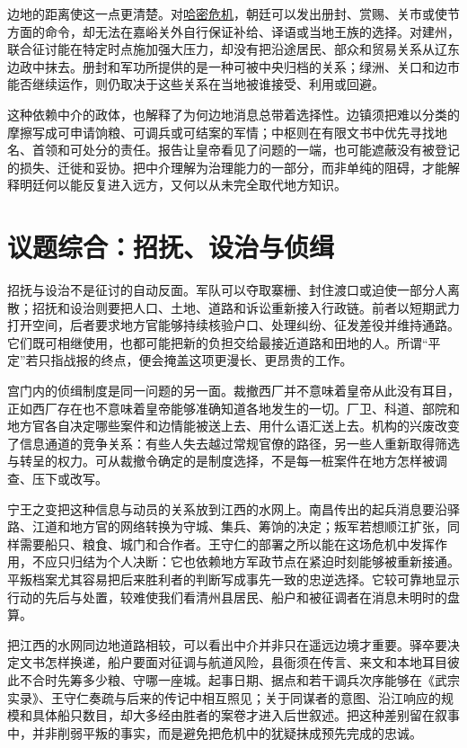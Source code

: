 边地的距离使这一点更清楚。对\hyperlink{evt:MM-1472-TURPAN-HAMI-SEIZURE}{哈密危机}，朝廷可以发出册封、赏赐、关市或使节方面的命令，却无法在嘉峪关外自行保证补给、译语或当地王族的选择。对建州，联合征讨能在特定时点施加强大压力，却没有把沿途居民、部众和贸易关系从辽东边政中抹去。册封和军功所提供的是一种可被中央归档的关系；绿洲、关口和边市能否继续运作，则仍取决于这些关系在当地被谁接受、利用或回避。

这种依赖中介的政体，也解释了为何边地消息总带着选择性。边镇须把难以分类的摩擦写成可申请饷粮、可调兵或可结案的军情；中枢则在有限文书中优先寻找地名、首领和可处分的责任。报告让皇帝看见了问题的一端，也可能遮蔽没有被登记的损失、迁徙和妥协。把中介理解为治理能力的一部分，而非单纯的阻碍，才能解释明廷何以能反复进入远方，又何以从未完全取代地方知识。

\section{议题综合：招抚、设治与侦缉}

招抚与设治不是征讨的自动反面。军队可以夺取寨栅、封住渡口或迫使一部分人离散；招抚和设治则要把人口、土地、道路和诉讼重新接入行政链。前者以短期武力打开空间，后者要求地方官能够持续核验户口、处理纠纷、征发差役并维持通路。它们既可相继使用，也都可能把新的负担交给最接近道路和田地的人。所谓“平定”若只指战报的终点，便会掩盖这项更漫长、更昂贵的工作。

宫门内的侦缉制度是同一问题的另一面。裁撤西厂并不意味着皇帝从此没有耳目，正如西厂存在也不意味着皇帝能够准确知道各地发生的一切。厂卫、科道、部院和地方官各自决定哪些案件和边情能被送上去、用什么语汇送上去。机构的兴废改变了信息通道的竞争关系：有些人失去越过常规官僚的路径，另一些人重新取得筛选与转呈的权力。可从裁撤令确定的是制度选择，不是每一桩案件在地方怎样被调查、压下或改写。

宁王之变把这种信息与动员的关系放到江西的水网上。南昌传出的起兵消息要沿驿路、江道和地方官的网络转换为守城、集兵、筹饷的决定；叛军若想顺江扩张，同样需要船只、粮食、城门和合作者。王守仁的部署之所以能在这场危机中发挥作用，不应只归结为个人决断：它也依赖地方军政节点在紧迫时刻能够被重新接通。平叛档案尤其容易把后来胜利者的判断写成事先一致的忠逆选择。它较可靠地显示行动的先后与处置，较难使我们看清州县居民、船户和被征调者在消息未明时的盘算。

把江西的水网同边地道路相较，可以看出中介并非只在遥远边境才重要。驿卒要决定文书怎样换递，船户要面对征调与航道风险，县衙须在传言、来文和本地耳目彼此不合时先筹多少粮、守哪一座城。起事日期、据点和若干调兵次序能够在《武宗实录》、王守仁奏疏与后来的传记中相互照见；关于同谋者的意图、沿江响应的规模和具体船只数目，却大多经由胜者的案卷才进入后世叙述。把这种差别留在叙事中，并非削弱平叛的事实，而是避免把危机中的犹疑抹成预先完成的忠诚。

